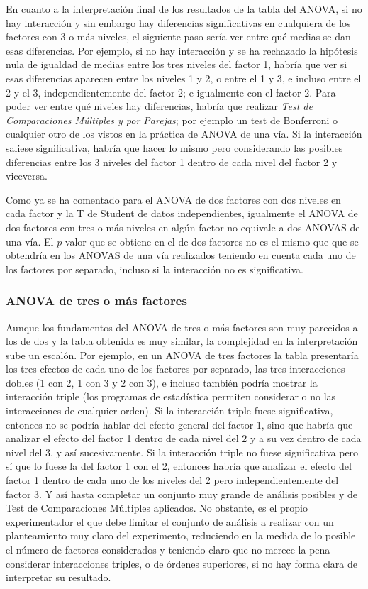 En cuanto a la interpretación final de los resultados de la tabla del ANOVA, si no hay interacción y sin embargo hay diferencias
significativas en cualquiera de los factores con 3 o más niveles, el siguiente paso sería ver entre qué medias se dan esas diferencias. Por
ejemplo, si no hay interacción y se ha rechazado la hipótesis nula de igualdad de medias entre los tres niveles del factor 1, habría que ver
si esas diferencias aparecen entre los niveles 1 y 2, o entre el 1 y 3, e incluso entre el 2 y el 3, independientemente del factor 2; e
igualmente con el factor 2. Para poder ver entre qué niveles hay diferencias, habría que realizar \emph{Test de Comparaciones Múltiples y
por Parejas}; por ejemplo un test de Bonferroni o cualquier otro de los vistos en la práctica de ANOVA de una vía. Si la interacción saliese
significativa, habría que hacer lo mismo pero considerando las posibles diferencias entre los 3 niveles del factor 1 dentro de cada nivel
del factor 2 y viceversa.

Como ya se ha comentado para el ANOVA de dos factores con dos niveles en cada factor y la T de Student de datos independientes, igualmente
el ANOVA de dos factores con tres o más niveles en algún factor no equivale a dos ANOVAS de una vía. El $p$-valor que se obtiene en el de
dos factores no es el mismo que que se obtendría en los ANOVAS de una vía realizados teniendo en cuenta cada uno de los factores por
separado, incluso si la interacción no es significativa.


\subsubsection{ANOVA de tres o más factores}
Aunque los fundamentos del ANOVA de tres o más factores son muy parecidos a los de dos y la tabla obtenida es muy similar, la complejidad en
la interpretación sube un escalón. Por ejemplo, en un ANOVA de tres factores la tabla presentaría los tres efectos de cada uno de los
factores por separado, las tres interacciones dobles (1 con 2, 1 con 3 y 2 con 3), e incluso también podría mostrar la interacción triple
(los programas de estadística permiten considerar o no las interacciones de cualquier orden). Si la interacción triple fuese significativa,
entonces no se podría hablar del efecto general del factor 1, sino que habría que analizar el efecto del factor 1 dentro de cada nivel del 2
y a su vez dentro de cada nivel del 3, y así sucesivamente. Si la interacción triple no fuese significativa pero sí que lo fuese la del
factor 1 con el 2, entonces habría que analizar el efecto del factor 1 dentro de cada uno de los niveles del 2 pero independientemente del
factor 3. Y así hasta completar un conjunto muy grande de análisis posibles y de Test de Comparaciones Múltiples aplicados. No obstante, es
el propio experimentador el que debe limitar el conjunto de análisis a realizar con un planteamiento muy claro del experimento, reduciendo
en la medida de lo posible el número de factores considerados y teniendo claro que no merece la pena considerar interacciones triples, o de
órdenes superiores, si no hay forma clara de interpretar su resultado.

